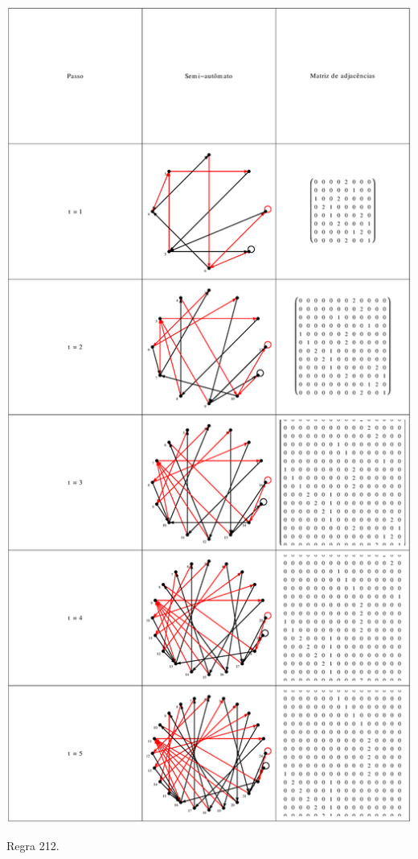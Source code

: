 \documentclass[12pt,a4paper]{article}
\begin{document}
\begin{table}[H]
\begin{center}
\includegraphics[scale=0.32]{img/mat/matr212.eps}
\caption{Regra 212.}
\label{tab:mr212}
\end{center}
\end{table}
\end{document}
